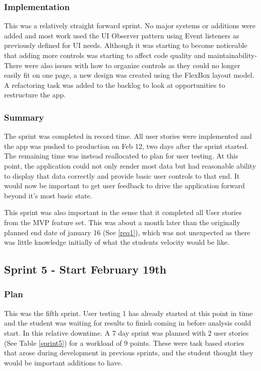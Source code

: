 \subsubsection{Implementation}
This was a relatively straight forward sprint. No major systems or additions were added and most work used the UI Observer pattern using Event listeners as previously defined for UI needs. Although it was starting to become noticeable that adding more controls was starting to affect code quality and maintainability- There were also issues with how to organize controls as they could no longer easily fit on one page, a new design was created using the FlexBox layout model. A refactoring task was added to the backlog to look at opportunities to restructure the app.

\subsubsection{Summary}
The sprint was completed in record time. All user stories were implemented and the app was pushed to production on Feb 12, two days after the sprint started. The remaining time was instead reallocated to plan for user testing. At this point, the application could not only render most data but had reasonable ability to display that data correctly and provide basic user controls to that end. It would now be important to get user feedback to drive the application forward beyond it's most basic state.

This sprint was also important in the sense that it completed all User stories from the MVP feature set. This was about a month later than the originally planned end date of january 16 (See \ref{req1}), which was not unexpected as there was little knowledge initially of what the students velocity would be like.


\subsection{Sprint 5 - Start February 19th} \label{s5}
\subsubsection{Plan}
This was the fifth sprint. User testing 1 has already started at this point in time and the student was waiting for results to finish coming in before analysis could start.
In this relative downtime. A 7 day sprint was planned with 2 user stories (See Table \ref{sprint5}) for a workload of 9 points. These were task based stories that arose during development in previous sprints, and the student thought they would be important additions to have.

